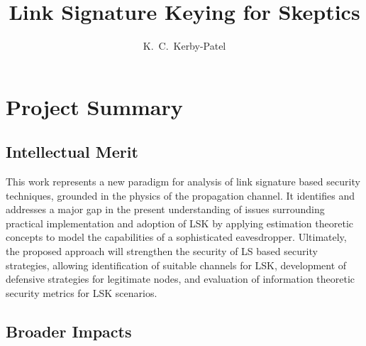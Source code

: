 \documentclass[12pt, titlepage]{article}
\title{Link Signature Keying for Skeptics}
\author{{\normalsize K.~C.~Kerby-Patel}}
\date{}
\begin{document}

\begin{titlepage}
\maketitle
\end{titlepage}
\section*{Project Summary}
\thispagestyle{empty}

\subsection*{Intellectual Merit}
This work represents a new paradigm for analysis of link signature based security techniques, grounded in the physics of the propagation channel.  It identifies and addresses a major gap in the present understanding of issues surrounding practical implementation and adoption of LSK by applying estimation theoretic concepts to model the capabilities of a sophisticated eavesdropper.  Ultimately, the proposed approach will strengthen the security of LS based security strategies, allowing identification of suitable channels for LSK, development of defensive strategies for legitimate nodes, and evaluation of information theoretic security metrics for LSK scenarios.

\subsection*{Broader Impacts}


\newpage
\setcounter{page}{1}
\end{document}
